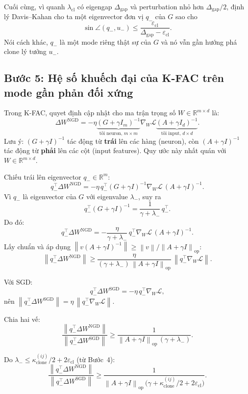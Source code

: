 \documentclass[11pt,a4paper]{article}
\newcommand{\R}{\mathbb{R}}
\newcommand{\norm}[1]{\left\lVert #1 \right\rVert}
\DeclareMathOperator{\op}{op}
\begin{document}
Cuối cùng, vì quanh $\lambda_{\mathrm{cl}}$ có eigengap
$\Delta_{\mathrm{gap}}$ và perturbation nhỏ hơn $\Delta_{\mathrm{gap}}/2$,
định lý Davis--Kahan cho ta một eigenvector đơn vị $q_-$ của $G$ sao cho
\[
\sin \angle(q_-,u_-)
\le
\frac{\varepsilon_{\mathrm{cl}}}{\Delta_{\mathrm{gap}}-\varepsilon_{\mathrm{cl}}}.
\]
Nói cách khác, $q_-$ là một mode riêng thật sự của $G$ và nó vẫn gần hướng phá
clone lý tưởng $u_-$.

\subsection*{Bước 5: Hệ số khuếch đại của K-FAC trên mode gần phản đối xứng}

Trong K-FAC, quyet định cập nhật cho ma trận trọng số $W \in \R^{m\times d}$ là:
\[
\Delta W^{\mathrm{NGD}}
=
-\eta \underbrace{(G+\gamma I_m)^{-1}}_{\text{tỡi neuron, } m\times m} \nabla_W \mathcal L \underbrace{(A+\gamma I_d)^{-1}}_{\text{tỡi input, } d\times d}.
\]
Lưu ý: $(G+\gamma I)^{-1}$ tác động từ \textbf{trái} lên các hàng (neuron), còn $(A+\gamma I)^{-1}$ tác động từ \textbf{phải} lên các cột (input features). Quy ước này nhất quán với $W \in \R^{m\times d}$.

Chiếu trái lên eigenvector $q_- \in \R^m$:
\[
q_-^\top \Delta W^{\mathrm{NGD}}
=
-\eta\, q_-^\top (G+\gamma I)^{-1} \nabla_W \mathcal L \,(A+\gamma I)^{-1}.
\]
Vì $q_-$ là eigenvector của $G$ với eigenvalue $\lambda_-$, suy ra
\[
q_-^\top(G+\gamma I)^{-1} = \frac{1}{\gamma+\lambda_-}\, q_-^\top.
\]
Do đó:
\[
q_-^\top \Delta W^{\mathrm{NGD}}
=
-\frac{\eta}{\gamma+\lambda_-}\, q_-^\top \nabla_W \mathcal L \,(A+\gamma I)^{-1}.
\]
Lấy chuẩn và áp dụng $\norm{v(A+\gamma I)^{-1}} \ge \norm{v}/\norm{A+\gamma I}_{\op}$:
\[
\norm{q_-^\top \Delta W^{\mathrm{NGD}}}
\ge
\frac{\eta}{(\gamma+\lambda_-)\,\norm{A+\gamma I}_{\op}}
\,\norm{q_-^\top \nabla_W \mathcal L}.
\]

Với SGD:
\[
q_-^\top \Delta W^{\mathrm{SGD}} = -\eta\, q_-^\top \nabla_W \mathcal L,
\]
nên $\norm{q_-^\top \Delta W^{\mathrm{SGD}}} = \eta\, \norm{q_-^\top \nabla_W \mathcal L}$.

Chia hai vế:
\[
\frac{\norm{q_-^\top \Delta W^{\mathrm{NGD}}}}
{\norm{q_-^\top \Delta W^{\mathrm{SGD}}}}
\ge
\frac{1}{\norm{A+\gamma I}_{\op}\,(\gamma + \lambda_-)}.
\]

Do $\lambda_- \le \kappa_{\mathrm{clone}}^{(ij)}/2 + 2\varepsilon_{\mathrm{cl}}$ (từ Bước~4):
\[
\frac{\norm{q_-^\top \Delta W^{\mathrm{NGD}}}}
{\norm{q_-^\top \Delta W^{\mathrm{SGD}}}}
\ge
\frac{1}{\norm{A+\gamma I}_{\op}\,\bigl(\gamma + \kappa_{\mathrm{clone}}^{(ij)}/2 + 2\varepsilon_{\mathrm{cl}}\bigr)}.
\]
\end{document}
